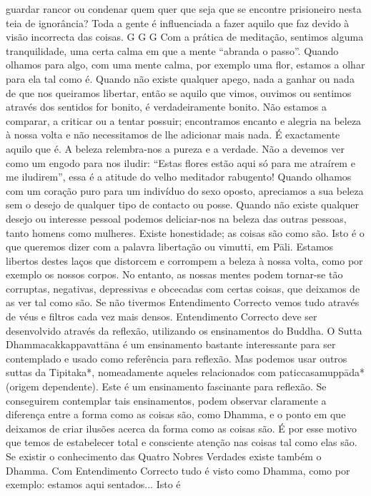 guardar rancor ou condenar quem quer que seja que se encontre
prisioneiro nesta teia de ignorância? Toda a gente é
influenciada a fazer aquilo que faz devido à visão incorrecta
das coisas.
G G G
Com a prática de meditação, sentimos alguma
tranquilidade, uma certa calma em que a mente “abranda o
passo”. Quando olhamos para algo, com uma mente calma,
por exemplo uma flor, estamos a olhar para ela tal como é.
Quando não existe qualquer apego, nada a ganhar ou nada de
que nos queiramos libertar, então se aquilo que vimos, ouvimos ou sentimos através dos sentidos for bonito, é verdadeiramente bonito. Não estamos a comparar, a criticar ou a
tentar possuir; encontramos encanto e alegria na beleza à
nossa volta e não necessitamos de lhe adicionar mais nada. É
exactamente aquilo que é.
A beleza relembra-nos a pureza e a verdade. Não a
devemos ver como um engodo para nos iludir: “Estas flores
estão aqui só para me atraírem e me iludirem”, essa é a atitude
do velho meditador rabugento! Quando olhamos com um
coração puro para um indivíduo do sexo oposto, apreciamos
a sua beleza sem o desejo de qualquer tipo de contacto ou
posse. Quando não existe qualquer desejo ou interesse pessoal
podemos deliciar-nos na beleza das outras pessoas, tanto
homens como mulheres. Existe honestidade; as coisas são
como são. Isto é o que queremos dizer com a palavra libertação
ou vimutti, em Pāli. Estamos libertos destes laços que distorcem
e corrompem a beleza à nossa volta, como por exemplo os
nossos corpos. No entanto, as nossas mentes podem tornar-se
tão corruptas, negativas, depressivas e obcecadas com certas
coisas, que deixamos de as ver tal como são. Se não tivermos
Entendimento Correcto vemos tudo através de véus e filtros
cada vez mais densos.
Entendimento Correcto deve ser desenvolvido através
da reflexão, utilizando os ensinamentos do Buddha. O
Sutta Dhammacakkappavattāna é um ensinamento bastante
interessante para ser contemplado e usado como referência
para reflexão. Mas podemos usar outros suttas da Tipitaka*,
nomeadamente aqueles relacionados com paticcasamuppāda*
(origem dependente). Este é um ensinamento fascinante para
reflexão. Se conseguirem contemplar tais ensinamentos,
podem observar claramente a diferença entre a forma como
as coisas são, como Dhamma, e o ponto em que deixamos
de criar ilusões acerca da forma como as coisas são. É por
esse motivo que temos de estabelecer total e consciente
atenção nas coisas tal como elas são. Se existir o conhecimento das Quatro Nobres Verdades existe também o
Dhamma.
Com Entendimento Correcto tudo é visto como
Dhamma, como por exemplo: estamos aqui sentados... Isto é
